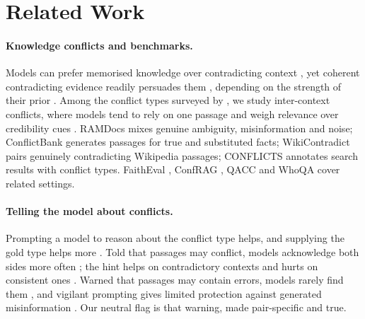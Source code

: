 \section{Related Work}
\label{sec:related}

\paragraph{Knowledge conflicts and benchmarks.}
Models can prefer memorised knowledge over contradicting context \citep{longpre2021entity}, yet coherent
contradicting evidence readily persuades them \citep{xie2024chameleon}, depending on the strength of their prior
\citep{wu2024clasheval}. Among the conflict types surveyed by \citet{xu2024survey}, we study inter-context conflicts,
where models tend to rely on one passage \citep{chen2022rich} and weigh relevance over credibility cues
\citep{wan2024convincing}. RAMDocs \citep{wang2025madam} mixes genuine ambiguity, misinformation and noise;
ConflictBank \citep{su2024conflictbank} generates passages for true and substituted facts; WikiContradict
\citep{hou2024wikicontradict} pairs genuinely contradicting Wikipedia passages; CONFLICTS \citep{cattan2025conflicts}
annotates search results with conflict types. FaithEval \citep{ming2025faitheval}, ConfRAG \citep{yuan2026confrag},
QACC \citep{liu2025qacc} and WhoQA \citep{pham2024whoqa} cover related settings.

\paragraph{Telling the model about conflicts.}
Prompting a model to reason about the conflict type helps, and supplying the gold type helps more
\citep{cattan2025conflicts}. Told that passages may conflict, models acknowledge both sides more often
\citep{hou2024wikicontradict}; the hint helps on contradictory contexts and hurts on consistent ones
\citep{gross2026ragability}. Warned that passages may contain errors, models rarely find them \citep{chen2024rgb},
and vigilant prompting gives limited protection against generated misinformation \citep{pan2023risk}. Our neutral
flag is that warning, made pair-specific and true.

